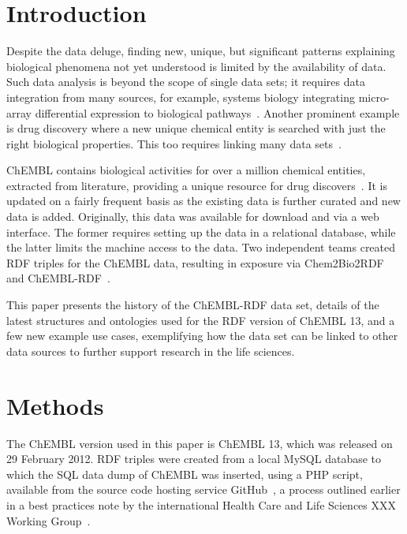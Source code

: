 \documentclass[sw]{iosart2c}
\begin{document}

\section{Introduction}\label{s1}

Despite the data deluge, finding new, unique, but significant patterns explaining biological
phenomena not yet understood is limited by the availability of data. Such data analysis is
beyond the scope of single data sets; it requires data integration from many sources, for
example, systems biology integrating micro-array differential expression to biological
pathways~\cite{}. Another prominent example is drug discovery where a new unique chemical entity is
searched with just the right biological properties. This too requires linking many
data sets~\cite{Samwald2011,OpenPHACTS}.

ChEMBL contains biological activities for over a million chemical entities, extracted from
literature, providing a unique resource for drug discovers~\cite{Gaulton2012,Warr2009}.
It is updated on a fairly frequent basis as the existing data is further curated and new data is added. Originally, this
data was available for download and via a web interface. The former requires setting up
the data in a relational database, while the latter limits the machine access to the data.
Two independent teams created RDF triples for the ChEMBL data, resulting in exposure
via Chem2Bio2RDF~\cite{Chen2010} and ChEMBL-RDF~\cite{Willighagen2011}.

This paper presents the history of the ChEMBL-RDF data set, details of the latest structures
and ontologies used for the RDF version of ChEMBL 13, and a few new example use cases,
exemplifying how the data set can be linked to other data sources to further support
research in the life sciences.

\section{Methods}\label{s2}

The ChEMBL version used in this paper is ChEMBL 13, which was released on 29 February 2012.
RDF triples were created from a local MySQL database to which the SQL data dump of ChEMBL was
inserted, using a PHP script, available from the source code hosting service
GitHub~\citep{ChEMBLRDFGitHub}, a process outlined earlier in a best practices note by
the international Health Care and Life Sciences XXX Working Group~\cite{Marshall2012}.
\end{document}
